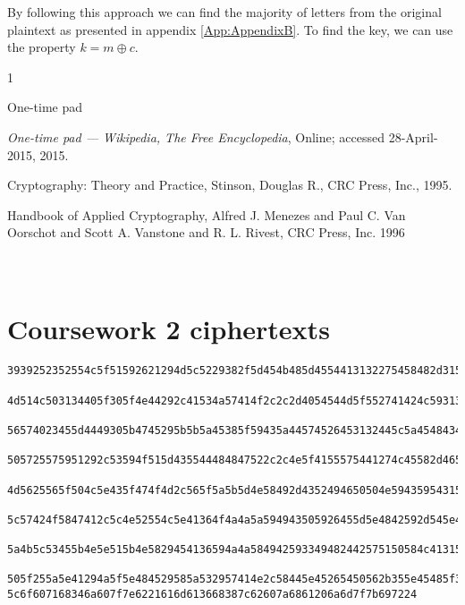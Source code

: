\documentclass{article}
\newcommand*\xor{\mathbin{\oplus}}
\begin{document}
By following this approach we can find the majority of letters from the original plaintext as presented in appendix \ref{App:AppendixB}. To find the key, we can use the property $ k = m \xor c $.


\begin{thebibliography}{1}

 One-time pad {\emph{One-time pad --- Wikipedia{,} The Free Encyclopedia},  Online; accessed 28-April-2015, 2015.

 Cryptography: Theory and Practice, Stinson, Douglas R., CRC Press, Inc., 1995.

 Handbook of Applied Cryptography,
 Alfred J. Menezes and Paul C. Van Oorschot and Scott A. Vanstone and R. L. Rivest,
 CRC Press, Inc.
 1996
}

\end{thebibliography}

\newpage
\appendix
\section{\\Coursework 2 ciphertexts } \label{App:AppendixA}
\tiny
\begin{verbatim}
3939252352554c5f51592621294d5c5229382f5d454b485d4554413132275458482d3157415046495c5b2a435a46543527364d5059394847382a2b4b555746404a38202d4c525652455c2a

4d514c503134405f305f4e44292c41534a57414f2c2c2d4054544d5f552741424c5931345f415d2c2e4d4454405e504142522e31424a434c5f2a2b415a412f585a55452d2e20394941562a

56574023455d4449305b4745295b5b5a45385f59435a44574526453132445c5a454843404d585a2c4146464e3246544146554531445c49574a435f573a

505725575951292c53594f515d435544484847522c2c4e5f4155575441274c45582d465d444c2e404b495859324f4f4227424131545644444d594e2e554a4b2c4757204947465f4c53572a

4d5625565f504c5e435f474f4d2c565f5a5b5d4e58492d4352494650504e59435954315d5b2047415e4758435349543553592e44595d4f504b5e4a4050244c5e4a48544249525849484b2a

5c57424f5847412c5c4e52554c5e41364f4a4a5a594943505926455d5e4842592d545e412854412c4c5a4f565927565c40534054455c2a43564e2b4d55415c4d413843445e485c4b533c

5a4b5c53455b4e5e515b4e5829454136594a4a584942593349482442575150584c413150414648495c4d44433253594542452e5e51394b524846424d555046435d4b20434157585d414b5722

505f255a5e41294a5f5e484529585a532957414e2c58445e45265450562b355e45485f34514f5b2c46495c523241495b4e45465453395e4a51592b2e574b5a5e405d57425c4b37
5c6f607168346a607f7e6221616d613668387c62607a6861206a6d7f7b697224

\end{verbatim}
\end{document}
